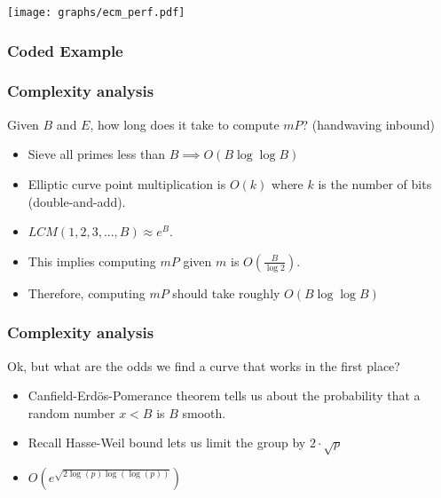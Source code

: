 \documentclass{beamer}
\begin{document}
\begin{frame}

\texttt{[image: graphs/ecm\_perf.pdf]}

\end{frame}

\begin{frame}
\frametitle{Coded Example}



\end{frame}

\begin{frame}
\frametitle{Complexity analysis}

Given $B$ and $E$, how long does it take to compute $mP$? (handwaving inbound)

\pause

\begin{itemize}[<+->]
	\item Sieve all primes less than $B \implies O(B \log \log B)$ \\
	\item Elliptic curve point multiplication is $O(k)$ where $k$ is the number of
		bits (double-and-add). \\
	\item $LCM(1,2,3,...,B) \approx e^B$.
	\item This implies computing $mP$ given $m$ is $O\left(\frac{B}{\log 2}\right)$.
	\item Therefore, computing $mP$ should take roughly $O(B \log \log B)$ \\
\end{itemize}

\end{frame}

\begin{frame}
\frametitle{Complexity analysis}

Ok, but what are the odds we find a curve that works in the first place?

\pause

\begin{itemize}[<+->]
	\item Canfield-Erdös-Pomerance theorem tells us about the probability that a
		random number $x < B$ is $B$ smooth. \\
	\item Recall Hasse-Weil bound lets us limit the group by $2 \cdot \sqrt{p}$  \\
	\item $O\left(e^{\sqrt{2\log(p) \log\left(\log(p)\right)}}\right)$
\end{itemize}

\end{frame}
\end{document}
